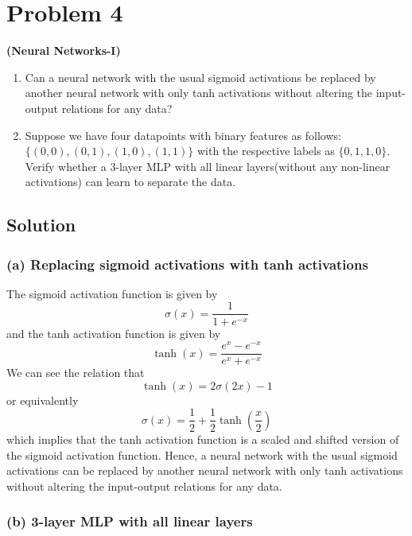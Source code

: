 \section*{Problem 4}

\textbf{(Neural Networks-I)}
\begin{enumerate}[label= (\alph*), noitemsep, topsep=0pt]
    \item Can a neural network with the usual sigmoid activations be replaced by another neural network with only tanh activations without altering the input-output relations for any data?

    \item Suppose we have four datapoints with binary features as follows:\\
          \( \{(0,0),(0,1),(1,0),(1,1)\} \) with the respective labels as \( \{0,1,1,0\} \).
          Verify whether a 3-layer MLP with all linear layers(without any non-linear activations) can learn to separate the data.
\end{enumerate}

\subsection*{Solution}

\subsubsection*{(a) Replacing sigmoid activations with tanh activations}

The sigmoid activation function is given by
\begin{equation*}
    \sigma(x)
    = \frac{1}{1 + e^{-x}}
\end{equation*}
and the tanh activation function is given by
\begin{equation*}
    \tanh(x)
    = \frac{e^x - e^{-x}}{e^x + e^{-x}}
\end{equation*}
We can see the relation that
\begin{equation*}
    \tanh(x)
    = 2\sigma(2x) - 1
\end{equation*}
or equivalently
\begin{equation*}
    \sigma(x)
    = \frac{1}{2} + \frac{1}{2} \tanh \left( \frac{x}{2} \right)
\end{equation*}
which implies that the tanh activation function is a scaled and shifted version of the sigmoid activation function.
Hence, a neural network with the usual sigmoid activations can be replaced by another neural network with only tanh activations without altering the input-output relations for any data.

\subsubsection*{(b) 3-layer MLP with all linear layers}
